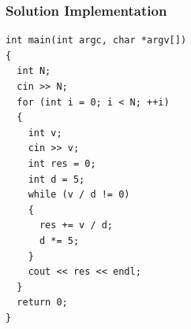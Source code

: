 \documentclass{beamer}
\newcounter{exo}
\newcommand{\exo}{
  \addtocounter{exo}{1}
  Exercice \arabic{exo}
}
\begin{document}
\begin{frame}[containsverbatim]
\frametitle{Solution Implementation}
\scriptsize

\begin{lstlisting}
int main(int argc, char *argv[])
{
  int N;
  cin >> N;
  for (int i = 0; i < N; ++i)
  {
    int v;
    cin >> v;
    int res = 0;
    int d = 5;
    while (v / d != 0)
    {
      res += v / d;
      d *= 5;
    }
    cout << res << endl;
  }
  return 0;
}
\end{lstlisting}

\end{frame}

\fi


\ifanswers
\end{document}
